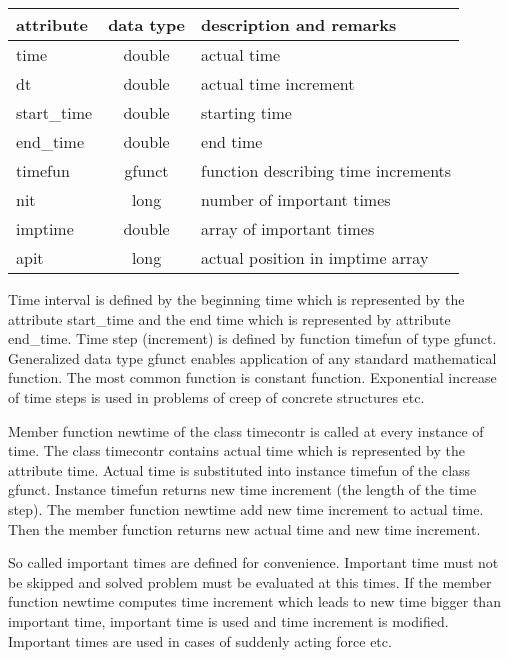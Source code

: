 \begin{center}
\begin{tabular}{|l|c|l|}
\hline
attribute & data type & description and remarks
\\ \hline \hline
{\sf time} & {\sf double} & actual time
\\ \hline
{\sf dt} & {\sf double} & actual time increment
\\ \hline
{\sf start\_time} & {\sf double} & starting time
\\ \hline
{\sf end\_time} & {\sf double} & end time
\\ \hline
{\sf timefun} & {\sf gfunct} & function describing time increments
\\ \hline
{\sf nit} & {\sf long} & number of important times
\\ \hline
{\sf *imptime} & {\sf double} & array of important times
\\ \hline
{\sf apit} & {\sf long} & actual position in imptime array
\\ \hline
\end{tabular}
\end{center}

Time interval is defined by the beginning time which is represented by the attribute {\sf start\_time}
and the end time which is represented by attribute {\sf end\_time}. Time step (increment) is defined
by function {\sf timefun} of type {\sf gfunct}. Generalized data type {\sf gfunct} enables application
of any standard mathematical function. The most common function is constant function. Exponential
increase of time steps is used in problems of creep of concrete structures etc.

Member function {\sf newtime} of the class {\sf timecontr} is called at every instance of time. The class {\sf timecontr}
contains actual time which is represented by the attribute {\sf time}. Actual time is substituted into
instance {\sf timefun} of the class {\sf gfunct}. Instance {\sf timefun} returns new time increment (the length
of the time step). The member function {\sf newtime} add new time increment to actual time. Then the member function
returns new actual time and new time increment.

So called important times are defined for convenience. Important time must not be skipped and solved problem
must be evaluated at this times. If the member function {\sf newtime} computes time increment which leads to new
time bigger than important time, important time is used and time increment is modified. Important times are used
in cases of suddenly acting force etc.

